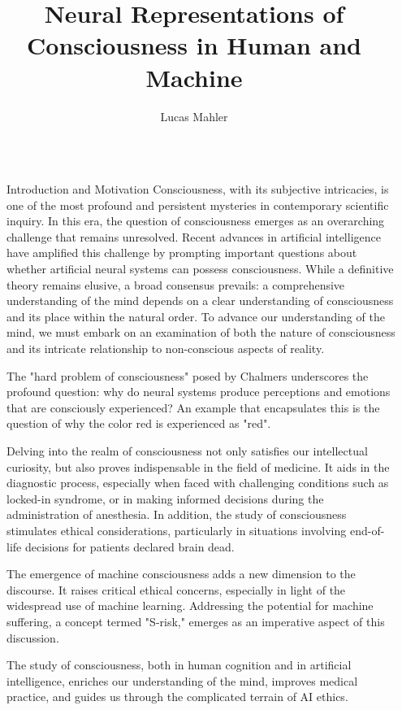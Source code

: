 \documentclass[final]{beamer}
\title{Neural Representations of Consciousness in Human and Machine}
\author{Lucas Mahler}
\newlength{\sepwidth}
\newlength{\colwidth}
\newcommand{\separatorcolumn}{\begin{column}{\sepwidth}\end{column}}
\begin{document}
\begin{frame}[t]
\begin{columns}[t]
\separatorcolumn

\begin{column}{\colwidth}

  \begin{block}{Introduction and Motivation}
Consciousness, with its subjective intricacies, is one of the most profound and persistent mysteries in contemporary scientific inquiry.
In this era, the question of consciousness emerges as an overarching challenge that remains unresolved.
Recent advances in artificial intelligence have amplified this challenge by prompting important questions about whether artificial neural systems can possess consciousness.
While a definitive theory remains elusive, a broad consensus prevails: a comprehensive understanding of the mind depends on a clear understanding of consciousness and its place within the natural order.
To advance our understanding of the mind, we must embark on an examination of both the nature of consciousness and its intricate relationship to non-conscious aspects of reality.

The "hard problem of consciousness" posed by Chalmers underscores the profound question: why do neural systems produce perceptions and emotions that are consciously experienced? An example that encapsulates this is the question of why the color red is experienced as "red".

Delving into the realm of consciousness not only satisfies our intellectual curiosity, but also proves indispensable in the field of medicine.
It aids in the diagnostic process, especially when faced with challenging conditions such as locked-in syndrome, or in making informed decisions during the administration of anesthesia.
In addition, the study of consciousness stimulates ethical considerations, particularly in situations involving end-of-life decisions for patients declared brain dead.

The emergence of machine consciousness adds a new dimension to the discourse.
It raises critical ethical concerns, especially in light of the widespread use of machine learning.
Addressing the potential for machine suffering, a concept termed "S-risk," emerges as an imperative aspect of this discussion.

The study of consciousness, both in human cognition and in artificial intelligence, enriches our understanding of the mind, improves medical practice, and guides us through the complicated terrain of AI ethics.
\end{block}


\end{column}
\end{columns}
\end{frame}
\end{document}
